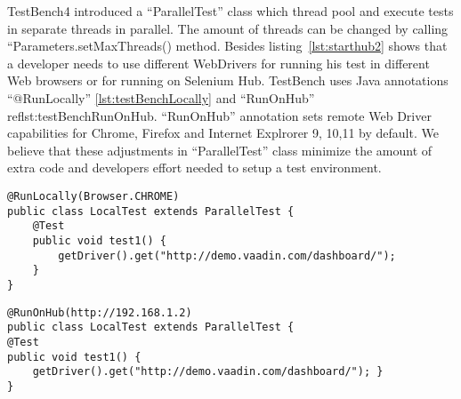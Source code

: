 TestBench4 introduced a ``ParallelTest'' class which thread pool and execute tests
in separate threads in parallel. The amount of threads can be changed by
calling ``Parameters.setMaxThreads() method. Besides listing~\ref{lst:starthub2}
shows that a developer needs to use different WebDrivers for running his test in
different Web browsers or for running on Selenium Hub. TestBench uses Java
annotations ``@RunLocally'' \ref{lst:testBenchLocally} and ``RunOnHub''
ref{lst:testBenchRunOnHub}.
``RunOnHub'' annotation sets remote Web Driver capabilities for Chrome, Firefox and Internet Explrorer 9,
10,11 by default. We believe that these adjustments in ``ParallelTest'' class
minimize the amount of extra code and developers effort needed to setup a test
environment.
\lstset{language=Java}
\begin{lstlisting}[caption=Run test in local Chrome browser locally,label={lst:testBenchLocally}] 
@RunLocally(Browser.CHROME)
public class LocalTest extends ParallelTest { 
	@Test
	public void test1() {
		getDriver().get("http://demo.vaadin.com/dashboard/");
	}
}
\end{lstlisting}

\lstset{language=Java}
\begin{lstlisting}[caption=Run tests on Selenium hub on http://192.168.1.2, label={lst:testBenchRunOnHub}]
@RunOnHub(http://192.168.1.2)
public class LocalTest extends ParallelTest {
@Test
public void test1() {
	getDriver().get("http://demo.vaadin.com/dashboard/"); }
}
\end{lstlisting}

